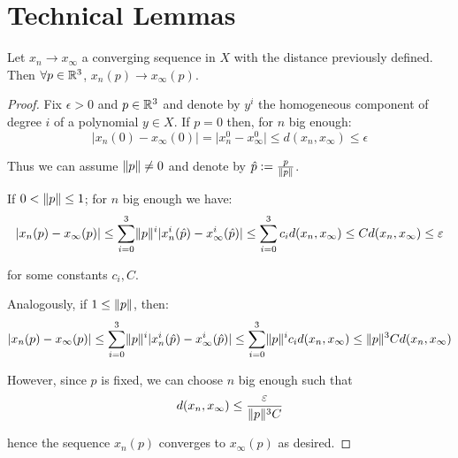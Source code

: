 \documentclass[9pt]{article}
\begin{document}
\section{Technical Lemmas}
\label{sec:lemmas}

\begin{lemma}\label{convergence}
 Let $x_n \rightarrow x_\infty$ a converging sequence in $X$ with the distance previously defined. Then $\forall p\in \mathbb{R}^3$, $x_n(p) \rightarrow x_\infty(p)$.
\end{lemma}
\begin{proof}
  Fix $\epsilon > 0$ and $p\in \mathbb{R}^3$ and denote by $y^i$ the homogeneous component of degree $i$ of a polynomial $y\in X$. If $p=0$ then, for $n$ big enough:
  \[
    \vert x_n(0) - x_\infty(0) \vert = \vert x_n^0 - x_\infty^0 \vert \leq d(x_n, x_\infty) \leq \epsilon
\]

Thus we can assume $\lVert p \rVert \neq 0$ and denote by $\hat{p}:=\frac{p}{\lVert p \rVert}$.

  If $0<\lVert p \rVert \leq 1$; for $n$ big enough we have: 
  \[
    \vert x_n(p) - x_\infty(p) \vert \leq \sum_{i=0}^3 \lVert p \rVert^i\vert x_n^i(\hat{p})-x_\infty^i(\hat{p})\vert \leq \sum_{i=0}^3c_id(x_n, x_\infty)\leq C d(x_n, x_\infty)\leq \varepsilon
  \]

  for some constants $c_i, C$.

  Analogously, if $1\leq \lVert p \rVert$, then:
  \[
    \vert x_n(p) - x_\infty(p) \vert \leq \sum_{i=0}^3 \lVert p \rVert^i\vert x_n^i(\hat{p})-x_\infty^i(\hat{p})\vert \leq \sum_{i=0}^3\lVert p \rVert^ic_id(x_n, x_\infty)\leq \lVert p \rVert^3 C d(x_n, x_\infty)
  \]

  However, since $p$ is fixed, we can choose $n$ big enough such that
  \[
    d(x_n, x_\infty)\leq \frac{\varepsilon}{\lVert p \rVert^3C}
\]

hence the sequence $x_n(p)$ converges to $x_\infty(p)$ as desired.
\end{proof}
\end{document}
